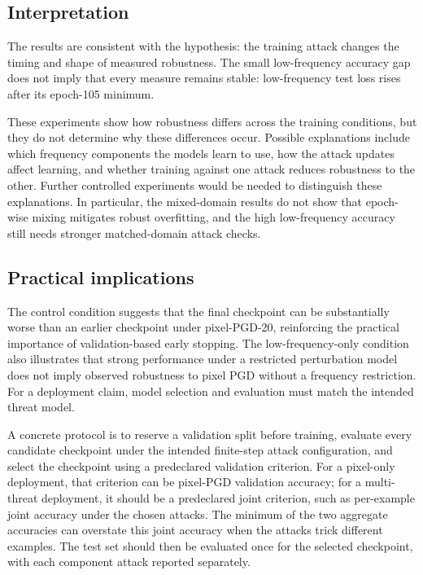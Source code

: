 \documentclass[11pt]{article}
\begin{document}
\subsection{Interpretation}
The results are consistent with the hypothesis: the training attack changes
the timing and shape of measured robustness. The small low-frequency accuracy
gap does not imply that every
measure remains stable: low-frequency test loss rises after its epoch-105
minimum.

These experiments show how robustness differs across the training conditions,
but they do not determine why these differences occur. Possible explanations
include which frequency components the models learn to use, how the attack
updates affect learning, and whether training against one attack reduces
robustness to the other. Further controlled experiments would be needed to
distinguish these explanations. In particular, the
mixed-domain results do not show that epoch-wise mixing mitigates robust
overfitting, and the high low-frequency accuracy still needs stronger
matched-domain attack checks.

\subsection{Practical implications}
The control condition suggests that the final checkpoint can be substantially
worse than an earlier checkpoint under pixel-PGD-20, reinforcing the practical
importance of validation-based early stopping. The low-frequency-only condition
also illustrates that strong performance under a restricted perturbation model
does not imply observed robustness to pixel PGD without a frequency
restriction. For a deployment
claim, model selection and evaluation must match the intended threat model.

A concrete protocol is to reserve a validation split before training, evaluate
every candidate checkpoint under the intended finite-step attack configuration,
and select the checkpoint using a predeclared validation criterion. For a
pixel-only deployment, that criterion can be pixel-PGD validation accuracy;
for a multi-threat deployment, it should be a predeclared joint criterion,
such as per-example joint accuracy under the chosen attacks. The
minimum of the two aggregate accuracies can overstate this joint accuracy
when the attacks trick different examples. The test set should then be evaluated
once
for the selected checkpoint, with each component attack reported separately.
\end{document}
